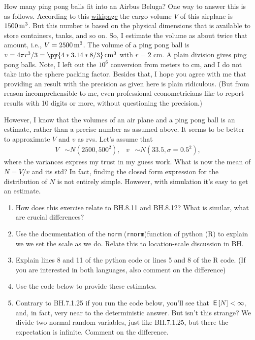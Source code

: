 \documentclass[assignments]{subfiles}
\begin{document}
\begin{exercise}\label{ex:2}
How many ping pong balls fit into an Airbus Beluga?
One way to answer this is as follows.
According to this \href{https://en.wikipedia.org/wiki/Airbus\_Beluga}{wikipage} the cargo volume $V$ of this airplane is $1500 \,\mathrm{m}^{3}$.
But this number is based on the physical dimensions that is available to store containers, tanks, and so on.
So, I estimate the volume as about twice that amount, i.e., $V = 2500 \,\mathrm{m}^{3}$.
The volume of a ping pong ball is $v = 4 \pi r^3/3  = \py{4*3.14*8/3} \cm^{3}$ with $r=2$ cm.
A plain division gives  ping pong balls.
Note, I left out the $10^{6}$ conversion from meters to cm, and I do not take into the sphere packing factor.
Besides that, I hope you agree with me that providing an result with the precision as given here is plain ridiculous.
(But from reason incomprehensible to me, even professional econometricians like to report results with 10 digits or more, without questioning the precision.)


However, I know that the volumes of an air plane and a ping pong ball is an estimate, rather than a precise number as assumed above.
It seems to be better to approximate $V$ and $v$ as rvs.
Let's assume that
   \begin{align*}
V & \sim N(2500, 500^{2}), & v  & \sim N(33.5, \sigma=0.5^{2}),
\end{align*}
where the variances express my trust in my guess work.
What is now the mean of $N = V/v$ and its std?
In fact, finding the closed form expression for the distribution of $N$ is not entirely simple.
However, with simulation it's easy to get an estimate.

\begin{enumerate}
\item How does this exercise relate to BH.8.11 and BH.8.12? What is similar, what are crucial differences?
\item Use the documentation of the \texttt{norm} (\texttt{rnorm})function of python (R) to explain we we set the scale as we do.
  Relate this to location-scale discussion in BH.
\item  Explain lines 8 and 11 of the python code or lines 5 and 8 of the R code. (If you are interested in both languages, also comment on the difference)
\item Use the code below to provide these estimates.
\item Contrary to BH.7.1.25 if you run the code below, you'll see that $\,\mathsf{E}\left[N\right] < \infty$, and, in fact, very near to the deterministic answer.
But isn't this strange?
We divide two normal random variables, just like BH.7.1.25, but there the expectation is infinite.
Comment on the difference.
\end{enumerate}



\end{exercise}
\end{document}
